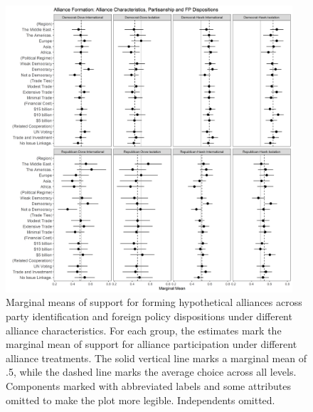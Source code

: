 \documentclass[12pt]{article}
\begin{document}
\begin{figure}
	\centering
		\includegraphics[width=0.95\textwidth]{../figures/party-dispo-form-char.png}
	\caption{Marginal means of support for forming hypothetical alliances across party identification and foreign policy dispositions under different alliance characteristics. For each group, the estimates mark the marginal mean of support for alliance participation under different alliance treatments. The solid vertical line marks a marginal mean of .5, while the dashed line marks the average choice across all levels. Components marked with abbreviated labels and some attributes omitted to make the plot more legible. Independents omitted.}
	\label{fig:party-dispo-form-char}
\end{figure}
\end{document}
